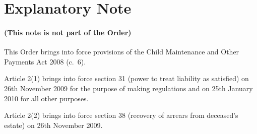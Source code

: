 \documentclass[12pt,a4paper]{article}
\begin{document}
\part{Explanatory Note}

\renewcommand\parthead{— Explanatory Note}

\subsection*{(This note is not part of the Order)}

This Order brings into force provisions of the Child Maintenance and Other Payments Act 2008 (c.~6).

Article 2(1) brings into force section 31 (power to treat liability as satisfied) on 26th November 2009 for the purpose of making regulations and on 25th January 2010 for all other purposes.

Article 2(2) brings into force section 38 (recovery of arrears from deceased’s estate) on 26th November 2009. 
\end{document}
